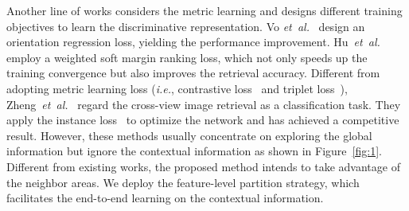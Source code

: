 \documentclass[journal]{IEEEtran}
\def\ie{\emph{i.e.}}
\def\etal{\emph{et~al.}}
\begin{document}
Another line of works considers the metric learning and designs different training objectives to learn the discriminative representation.
Vo \etal~\cite{vo_localizing_2017} design an orientation regression loss, yielding the performance improvement. 
Hu~\etal~\cite{hu_cvm-net_2018} employ a weighted soft margin ranking loss, which not only speeds up the training convergence but also improves the retrieval accuracy. Different from adopting metric learning loss (\ie, contrastive loss~\cite{hadsell2006dimensionality,deng2018image} and triplet loss~\cite{schroff2015facenet,li2020hierarchical}), Zheng~\etal~\cite{zheng_university-1652_nodate} regard the cross-view image retrieval as a classification task. They apply the instance loss~\cite{zheng2017unlabeled,zheng2020dual} to optimize the network and has achieved a competitive result. 
However, these methods usually concentrate on exploring the global information but ignore the contextual information as shown in Figure~\ref{fig:1}. Different from existing works, the proposed method intends to take advantage of the neighbor areas. We deploy the feature-level partition strategy, which facilitates the end-to-end learning on the contextual information.   
\end{document}
